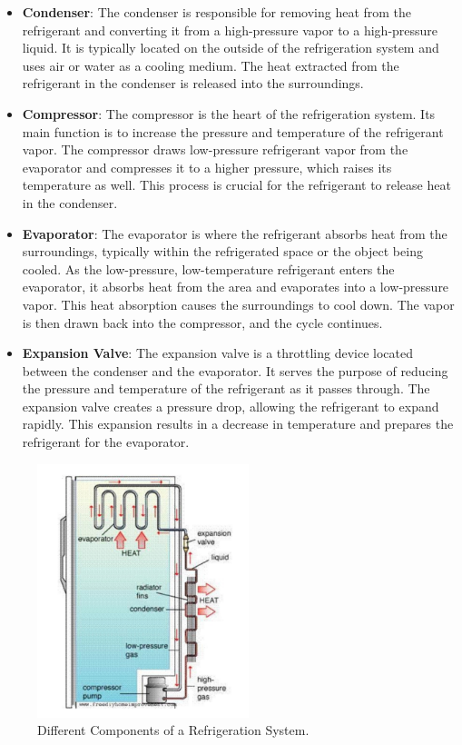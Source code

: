 \documentclass{article}
\begin{document}
\begin{itemize}
  \item \textbf{Condenser}: The condenser is responsible for removing heat from the refrigerant and converting it from a high-pressure vapor to a high-pressure liquid. It is typically located on the outside of the refrigeration system and uses air or water as a cooling medium. The heat extracted from the refrigerant in the condenser is released into the surroundings.

  \item \textbf{Compressor}: The compressor is the heart of the refrigeration system. Its main function is to increase the pressure and temperature of the refrigerant vapor. The compressor draws low-pressure refrigerant vapor from the evaporator and compresses it to a higher pressure, which raises its temperature as well. This process is crucial for the refrigerant to release heat in the condenser.
  
  
  \item \textbf{Evaporator}: The evaporator is where the refrigerant absorbs heat from the surroundings, typically within the refrigerated space or the object being cooled. As the low-pressure, low-temperature refrigerant enters the evaporator, it absorbs heat from the area and evaporates into a low-pressure vapor. This heat absorption causes the surroundings to cool down. The vapor is then drawn back into the compressor, and the cycle continues.
  
  \item \textbf{Expansion Valve}: The expansion valve is a throttling device located between the condenser and the evaporator. It serves the purpose of reducing the pressure and temperature of the refrigerant as it passes through. The expansion valve creates a pressure drop, allowing the refrigerant to expand rapidly. This expansion results in a decrease in temperature and prepares the refrigerant for the evaporator.
\end{itemize}

\begin{figure}[H]
  \centering
  \includegraphics[width=0.55\textwidth]{img/components.png}
  \caption{Different Components of a Refrigeration System.}
  \label{fig:Different Components of a Refrigeration System}
\end{figure}
\vspace{0.25cm}
\end{document}
